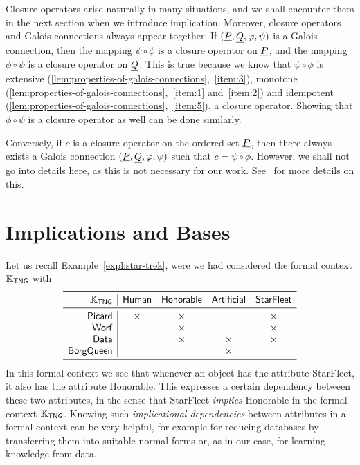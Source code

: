 Closure operators arise naturally in many situations, and we shall encounter them in the
next section when we introduce implication.  Moreover, closure operators and Galois
connections always appear together: If $({\underline{P}}, {\underline{Q}}, \varphi, \psi)$ is a Galois
connection, then the mapping $\psi \circ \phi$ is a closure operator on ${\underline{P}}$, and the
mapping $\phi \circ \psi$ is a closure operator on ${\underline{Q}}$.  This is true because we know
that $\psi \circ \phi$ is extensive
(\ref{lem:properties-of-galois-connections},~\ref{item:3}), monotone
(\ref{lem:properties-of-galois-connections},~\ref{item:1} and~\ref{item:2}) and idempotent
(\ref{lem:properties-of-galois-connections},~\ref{item:5}), \ie a closure operator.
Showing that $\phi \circ \psi$ is a closure operator as well can be done similarly.

Conversely, if $c$ is a closure operator on the ordered set ${\underline{P}}$, then there always
exists a Galois connection $({\underline{P}}, {\underline{Q}}, \varphi, \psi)$ such that $c = \psi \circ \phi$.
However, we shall not go into details here, as this is not necessary for our work.
See~\cite{fca-book} for more details on this.


\section{Implications and Bases}
\label{sec:implications-sets}

Let us recall Example~\ref{expl:star-trek}, were we had considered the formal context
${\mathbb{K}}_{\mathsf{TNG}}$ with
\begin{equation*}
  \def\x{\times}
  \begin{array}{r|*{4}{c}}
    \toprule
    \con K_{\mathsf{TNG}} & \mathsf{Human} & \mathsf{Honorable} & \mathsf{Artificial} & \mathsf{StarFleet} \\
    \midrule
    \mathsf{Picard} & \x & \x & & \x \\
    \mathsf{Worf} & & \x & & \x \\
    \mathsf{Data} & & \x & \x & \x \\
    \mathsf{BorgQueen} & & & \x & \\
    \bottomrule
  \end{array}
\end{equation*}
In this formal context we see that whenever an object has the attribute
\textsf{StarFleet}, it also has the attribute \textsf{Honorable}.  This expresses a
certain dependency between these two attributes, in the sense that \textsf{StarFleet}
\emph{implies} \textsf{Honorable} in the formal context ${\mathbb{K}}_{\mathsf{TNG}}$.  Knowing
such \emph{implicational dependencies} between attributes in a formal context can be very
helpful, for example for reducing databases by transferring them into suitable normal
forms or, as in our case, for learning knowledge from data.

